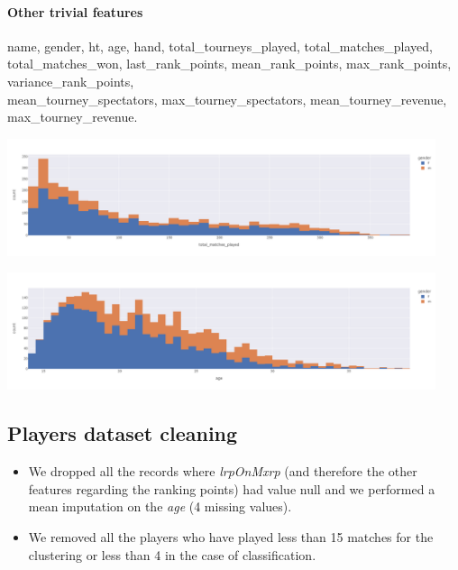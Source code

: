 \documentclass{article}
\begin{document}
\paragraph{Other trivial features}
name, gender, ht, age, hand, total\_tourneys\_played, total\_matches\_played,\\ total\_matches\_won, last\_rank\_points, mean\_rank\_points, max\_rank\_points, variance\_rank\_points, \\ mean\_tourney\_spectators, max\_tourney\_spectators, mean\_tourney\_revenue, max\_tourney\_revenue.    
\begin{center}
	\includegraphics[height=130px]{plots/hists_feats_clustering/total_matches_played_Hist.png}
	\label{fig:total_matches_played_Hist}
	\label{fig1}
\end{center}
\begin{center}
	\includegraphics[height=130px]{plots/hists_feats_clustering/age_Hist.png}
	\label{fig:age_Hist}
	\label{fig1}
\end{center}

\subsection{Players dataset cleaning}
   \begin{itemize}
  	\item We  dropped  all  the  records  where \textit{lrpOnMxrp} (and  therefore  the  other  features  regarding  the  ranking points) had value null and we performed a mean imputation on the \textit{age} (4 missing values).
  	\item We removed all the players who have played less than 15 matches for the clustering or less than 4 in the case of classification.
  \end{itemize}

\newpage
   

\newpage


\newpage

\end{document}
